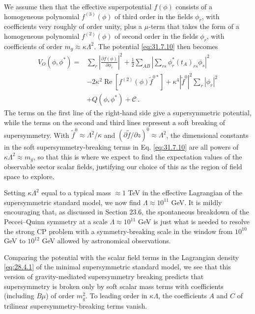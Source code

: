 We assume then that the effective superpotential \(f(\phi)\) consists of a
homogeneous polynomial \(f^{(3)}(\phi)\) of third order in the fields
\(\phi_r\), with coefficients very roughly of order unity, plus a
\(\mu\)-term that takes the form of a homogeneous polynomial
\(f^{(2)}(\phi)\) of second order in the fields \(\phi_r\), with
coefficients of order \(m_g\approx\kappa\Lambda^2\). The potential
\eqref{eq:31.7.10} then becomes
\begin{equation}
  \begin{aligned}
  V_O(\phi,\phi^*)={}&
  \sum_r\left|\frac{\partial f(\phi)}{\partial\phi_r}\right|^2
  +\frac12\sum_{AB}\left|
    \sum_{rs}\phi_r^*(t_A)_{rs}\phi_s
  \right|^2
  \\
  &-2\kappa^2\operatorname{Re}
    \left[f^{(2)}(\phi)\widetilde f^{0*}\right]
  +\kappa^4|\widetilde f^0|^2\sum_r|\phi_r|^2
  \\
  &+Q(\phi,\phi^*)+\mathcal C\,.
  \end{aligned}
  \tag{31.7.11}\label{eq:31.7.11}
\end{equation}
The terms on the first line of the right-hand side give a supersymmetric
potential, while the terms on the second and third lines represent a soft
breaking of supersymmetry. With \(\widetilde f^0\approx\Lambda^2/\kappa\)
and \((\partial\widetilde f/\partial z)^0\approx\Lambda^2\), the dimensional
constants in the soft supersymmetry-breaking terms in
Eq. \eqref{eq:31.7.10} are all powers of
\(\kappa\Lambda^2\approx m_g\), so that this is where we expect to find the
expectation values of the observable sector scalar fields, justifying our
choice of this as the region of field space to explore.

Setting \(\kappa\Lambda^2\) equal to a typical mass \(\approx1\) TeV in the
effective Lagrangian of the supersymmetric standard model, we now find
\(\Lambda\approx10^{11}\) GeV. It is mildly encouraging that, as discussed
in Section 23.6, the spontaneous breakdown of the Peccei--Quinn symmetry at
a scale \(\Lambda\approx10^{11}\) GeV is just what is needed to resolve the
strong CP problem with a symmetry-breaking scale in the window from
\(10^{10}\) GeV to \(10^{12}\) GeV allowed by astronomical observations.

Comparing the potential with the scalar field terms in the Lagrangian
density \eqref{eq:28.4.1} of the minimal supersymmetric standard model, we
see that this version of gravity-mediated supersymmetry breaking predicts
that supersymmetry is broken only by soft scalar mass terms with
coefficients (including \(B\mu\)) of order \(m_g^2\). To leading order in
\(\kappa\Lambda\), the coefficients \(A\) and \(C\) of trilinear
supersymmetry-breaking terms vanish.


